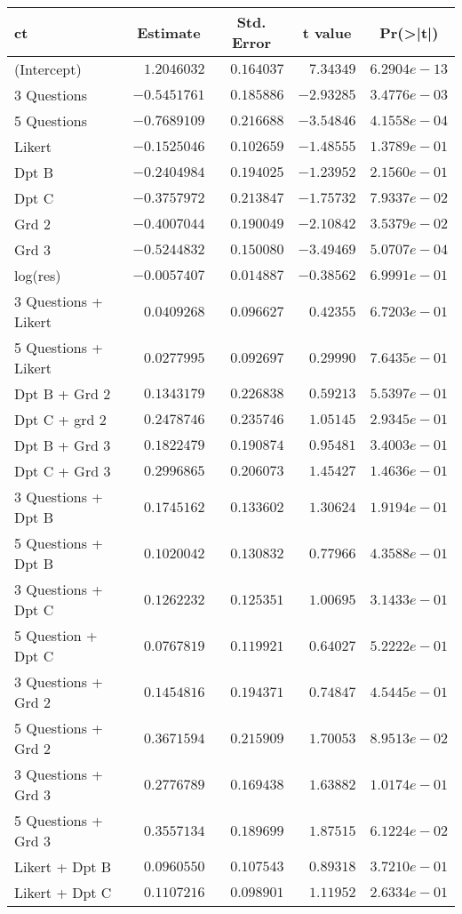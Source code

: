 \begin{table}[!tbp]
\begin{center}
\begin{tabular}{lrrrr}
\hline\hline
\multicolumn{1}{l}{ct}&\multicolumn{1}{c}{Estimate}&\multicolumn{1}{c}{Std. Error}&\multicolumn{1}{c}{t value}&\multicolumn{1}{c}{Pr(\textgreater |t|)}\tabularnewline
\hline
(Intercept)&$ 1.2046032$&$0.164037$&$ 7.34349$&$6.2904e-13$\tabularnewline
3 Questions&$-0.5451761$&$0.185886$&$-2.93285$&$3.4776e-03$\tabularnewline
5 Questions&$-0.7689109$&$0.216688$&$-3.54846$&$4.1558e-04$\tabularnewline
Likert&$-0.1525046$&$0.102659$&$-1.48555$&$1.3789e-01$\tabularnewline
Dpt B&$-0.2404984$&$0.194025$&$-1.23952$&$2.1560e-01$\tabularnewline
Dpt C&$-0.3757972$&$0.213847$&$-1.75732$&$7.9337e-02$\tabularnewline
Grd 2&$-0.4007044$&$0.190049$&$-2.10842$&$3.5379e-02$\tabularnewline
Grd 3&$-0.5244832$&$0.150080$&$-3.49469$&$5.0707e-04$\tabularnewline
log(res)&$-0.0057407$&$0.014887$&$-0.38562$&$6.9991e-01$\tabularnewline
3 Questions + Likert&$ 0.0409268$&$0.096627$&$ 0.42355$&$6.7203e-01$\tabularnewline
5 Questions + Likert&$ 0.0277995$&$0.092697$&$ 0.29990$&$7.6435e-01$\tabularnewline
Dpt B + Grd 2&$ 0.1343179$&$0.226838$&$ 0.59213$&$5.5397e-01$\tabularnewline
Dpt C + grd 2&$ 0.2478746$&$0.235746$&$ 1.05145$&$2.9345e-01$\tabularnewline
Dpt B + Grd 3&$ 0.1822479$&$0.190874$&$ 0.95481$&$3.4003e-01$\tabularnewline
Dpt C + Grd 3&$ 0.2996865$&$0.206073$&$ 1.45427$&$1.4636e-01$\tabularnewline
3 Questions + Dpt B&$ 0.1745162$&$0.133602$&$ 1.30624$&$1.9194e-01$\tabularnewline
5 Questions + Dpt B&$ 0.1020042$&$0.130832$&$ 0.77966$&$4.3588e-01$\tabularnewline
3 Questions + Dpt C&$ 0.1262232$&$0.125351$&$ 1.00695$&$3.1433e-01$\tabularnewline
5 Question + Dpt C&$ 0.0767819$&$0.119921$&$ 0.64027$&$5.2222e-01$\tabularnewline
3 Questions + Grd 2&$ 0.1454816$&$0.194371$&$ 0.74847$&$4.5445e-01$\tabularnewline
5 Questions + Grd 2&$ 0.3671594$&$0.215909$&$ 1.70053$&$8.9513e-02$\tabularnewline
3 Questions + Grd 3&$ 0.2776789$&$0.169438$&$ 1.63882$&$1.0174e-01$\tabularnewline
5 Questions + Grd 3&$ 0.3557134$&$0.189699$&$ 1.87515$&$6.1224e-02$\tabularnewline
Likert + Dpt B&$ 0.0960550$&$0.107543$&$ 0.89318$&$3.7210e-01$\tabularnewline
Likert + Dpt C&$ 0.1107216$&$0.098901$&$ 1.11952$&$2.6334e-01$\tabularnewline
\hline
\end{tabular}\end{center}
\end{table}

